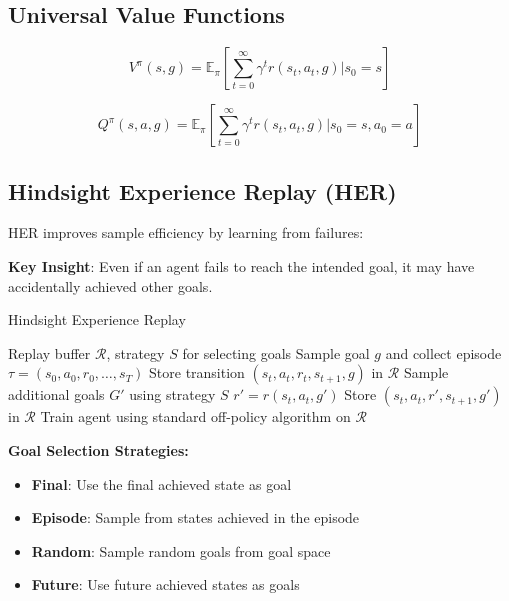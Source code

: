 \subsection{Universal Value Functions}

\begin{equation}
V^\pi(s, g) = \mathbb{E}_\pi \left[ \sum_{t=0}^\infty \gamma^t r(s_t, a_t, g) \bigg| s_0 = s \right]
\end{equation}

\begin{equation}
Q^\pi(s, a, g) = \mathbb{E}_\pi \left[ \sum_{t=0}^\infty \gamma^t r(s_t, a_t, g) \bigg| s_0 = s, a_0 = a \right]
\end{equation}

\subsection{Hindsight Experience Replay (HER)}

HER improves sample efficiency by learning from failures:

\textbf{Key Insight}: Even if an agent fails to reach the intended goal, it may have accidentally achieved other goals.

\begin{algorithm}
\caption{Hindsight Experience Replay}
\begin{algorithmic}
\REQUIRE Replay buffer $\mathcal{R}$, strategy $S$ for selecting goals
    \STATE Sample goal $g$ and collect episode $\tau = (s_0, a_0, r_0, \ldots, s_T)$
        \STATE Store transition $(s_t, a_t, r_t, s_{t+1}, g)$ in $\mathcal{R}$
        \STATE Sample additional goals $G'$ using strategy $S$
            \STATE $r' = r(s_t, a_t, g')$ 
            \STATE Store $(s_t, a_t, r', s_{t+1}, g')$ in $\mathcal{R}$
        \ENDFOR
    \ENDFOR
    \STATE Train agent using standard off-policy algorithm on $\mathcal{R}$
\ENDFOR
\end{algorithmic}
\end{algorithm}

\textbf{Goal Selection Strategies:}
\begin{itemize}
    \item \textbf{Final}: Use the final achieved state as goal
    \item \textbf{Episode}: Sample from states achieved in the episode
    \item \textbf{Random}: Sample random goals from goal space
    \item \textbf{Future}: Use future achieved states as goals
\end{itemize}

